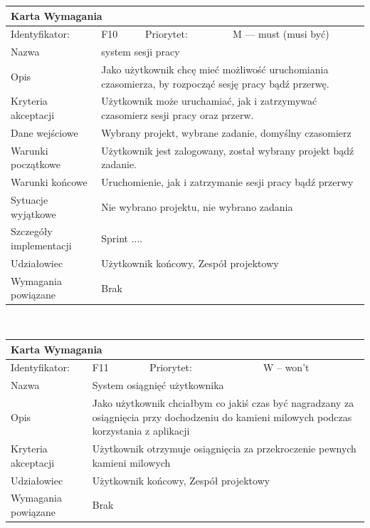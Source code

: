 \documentclass[a4paper,11pt]{report}
\begin{document}
		\begin{tabular}{|p{3cm}|p{2cm}|p{2cm}|p{6cm}|}
		\hline
		\multicolumn{4}{|p{12 cm}|}{Karta Wymagania}\\
		\hline
		Identyfikator: & F10 & Priorytet: & M — must (musi być)\\
		\hline
		Nazwa & \multicolumn{3}{|p{10 cm}|}{system sesji pracy}\\
		\hline
		Opis & \multicolumn{3}{|p{10 cm}|}{Jako użytkownik chcę mieć możliwość uruchomiania czasomierza, by rozpocząć sesję pracy bądź przerwę.}\\
		\hline
		Kryteria akceptacji & \multicolumn{3}{|p{10 cm}|}{Użytkownik może uruchamiać, jak i zatrzymywać czasomierz sesji pracy oraz przerw.}\\
		\hline
		Dane wejściowe & \multicolumn{3}{|p{10 cm}|}{Wybrany projekt, wybrane zadanie, domyślny czasomierz}\\
		\hline
		Warunki początkowe & \multicolumn{3}{|p{10 cm}|}{Użytkownik jest zalogowany, został wybrany projekt bądź zadanie.}\\
		\hline
		Warunki końcowe & \multicolumn{3}{|p{10 cm}|}{Uruchomienie, jak i zatrzymanie sesji pracy bądź przerwy}\\
		\hline
		Sytuacje wyjątkowe & \multicolumn{3}{|p{10 cm}|}{Nie wybrano projektu, nie wybrano zadania}\\
		\hline
		Szczegóły implementacji & \multicolumn{3}{|p{10 cm}|}{Sprint ....}\\
		\hline
		Udziałowiec & \multicolumn{3}{|p{10 cm}|}{Użytkownik końcowy, Zespół projektowy}\\
		\hline
		Wymagania powiązane & \multicolumn{3}{|p{10 cm}|}{Brak}\\
		\hline
		\end{tabular}\\
		\newline
		\vspace*{0,2 cm}
		\newline
		\begin{tabular}{|p{3cm}|p{2cm}|p{2cm}|p{6cm}|}
		\hline
		\multicolumn{4}{|p{12 cm}|}{Karta Wymagania}\\
		\hline
		Identyfikator: & F11 & Priorytet: & W – won't \\
		\hline
		Nazwa & \multicolumn{3}{|p{10 cm}|}{System osiągnięć użytkownika}\\
		\hline
		Opis & \multicolumn{3}{|p{10 cm}|}{Jako użytkownik chciałbym co jakiś czas być nagradzany za osiągnięcia przy dochodzeniu do kamieni milowych podczas korzystania z aplikacji}\\
		\hline
		Kryteria akceptacji & \multicolumn{3}{|p{10 cm}|}{Użytkownik otrzymuje osiągnięcia za przekroczenie pewnych kamieni milowych}\\
		\hline
		Udziałowiec & \multicolumn{3}{|p{10 cm}|}{Użytkownik końcowy, Zespół projektowy}\\
		\hline
		Wymagania powiązane & \multicolumn{3}{|p{10 cm}|}{Brak}\\
		\hline
		\end{tabular}\\
\end{document}
